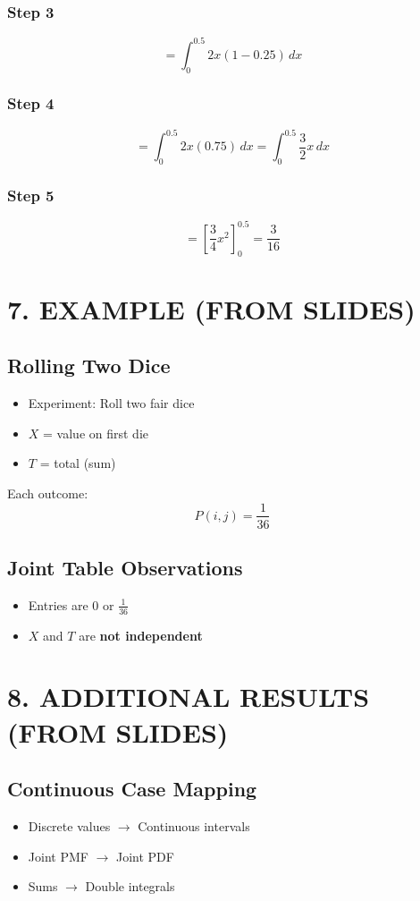 \documentclass[12pt]{article}
\begin{document}
\subsubsection*{Step 3}
\[
= \int_0^{0.5} 2x (1 - 0.25)\,dx
\]

\subsubsection*{Step 4}
\[
= \int_0^{0.5} 2x(0.75)\,dx
= \int_0^{0.5} \frac{3}{2}x\,dx
\]

\subsubsection*{Step 5}
\[
= \left[ \frac{3}{4}x^2 \right]_0^{0.5}
= \frac{3}{16}
\]

\section*{7. EXAMPLE (FROM SLIDES)}

\subsection*{Rolling Two Dice}
\begin{itemize}
\item Experiment: Roll two fair dice
\item $X$ = value on first die
\item $T$ = total (sum)
\end{itemize}

Each outcome:
\[
P(i,j) = \frac{1}{36}
\]

\subsection*{Joint Table Observations}
\begin{itemize}
\item Entries are $0$ or $\frac{1}{36}$
\item $X$ and $T$ are \textbf{not independent}
\end{itemize}

\section*{8. ADDITIONAL RESULTS (FROM SLIDES)}

\subsection*{Continuous Case Mapping}
\begin{itemize}
\item Discrete values $\rightarrow$ Continuous intervals
\item Joint PMF $\rightarrow$ Joint PDF
\item Sums $\rightarrow$ Double integrals
\end{itemize}
\end{document}
